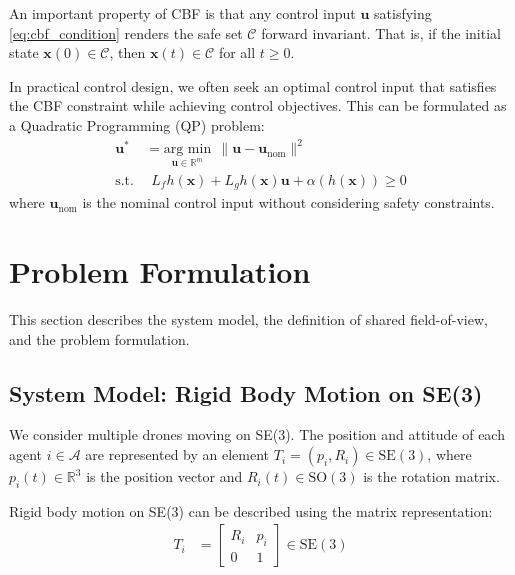 \documentclass[fleqn,10pt,twocolumn]{SICE_FES25}
\theoremstyle{definition}
\theoremstyle{plain}
\begin{document}
An important property of CBF is that any control input ${\mathbf{u}}$ satisfying \eqref{eq:cbf_condition} renders the safe set ${\mathcal{C}}$ forward invariant. That is, if the initial state ${\mathbf{x}}(0) \in {\mathcal{C}}$, then ${\mathbf{x}}(t) \in {\mathcal{C}}$ for all $t \geq 0$.

In practical control design, we often seek an optimal control input that satisfies the CBF constraint while achieving control objectives. This can be formulated as a Quadratic Programming (QP) problem:
\begin{equation}
\begin{aligned}
{\mathbf{u}}^* &= \underset{{\mathbf{u}} \in {\mathbb{R}}^m}{\text{arg min}} \:\: \|{\mathbf{u}} - {\mathbf{u}}_{\text{nom}}\|^2 \\
\text{s.t.} & \:\: L_f h({\mathbf{x}}) + L_g h({\mathbf{x}}){\mathbf{u}} + \alpha(h({\mathbf{x}})) \geq 0
\label{eq:cbf_qp}
\end{aligned}
\end{equation}
where ${\mathbf{u}}_{\text{nom}}$ is the nominal control input without considering safety constraints.

\section{Problem Formulation}

This section describes the system model, the definition of shared field-of-view, and the problem formulation.

\subsection{System Model: Rigid Body Motion on SE(3)}

We consider multiple drones moving on SE(3). The position and attitude of each agent $i \in \mathcal{A}$ are represented by an element $T_i = (p_i, R_i) \in \mathrm{SE}(3)$, where $p_i(t) \in {\mathbb{R}}^3$ is the position vector and $R_i(t) \in \mathrm{SO}(3)$ is the rotation matrix.

Rigid body motion on SE(3) can be described using the matrix representation:
\begin{equation}
\begin{aligned}
T_i &= \begin{bmatrix}
R_i & p_i \\
0 & 1
\end{bmatrix} \in \mathrm{SE}(3)
\label{eq:se3_matrix}
\end{aligned}
\end{equation}
\end{document}
